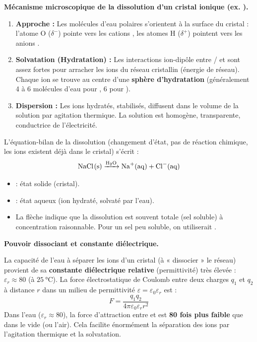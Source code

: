 \documentclass[11pt]{article}
\begin{document}
\textbf{Mécanisme microscopique de la dissolution d'un cristal ionique (ex. ).}\par
\begin{enumerate}
    \item \textbf{Approche :} Les molécules d'eau polaires s'orientent à la surface du cristal : l'atome O ($\delta^-$) pointe vers les cations , les atomes H ($\delta^+$) pointent vers les anions .
    \item \textbf{Solvatation (Hydratation) :} Les interactions ion-dipôle entre / et  sont assez fortes pour arracher les ions du réseau cristallin (énergie de réseau). Chaque ion se trouve au centre d'une \textbf{sphère d'hydratation} (généralement 4 à 6 molécules d'eau pour , 6 pour ).
    \item \textbf{Dispersion :} Les ions hydratés, stabilisés, diffusent dans le volume de la solution par agitation thermique. La solution est homogène, transparente, conductrice de l'électricité.
\end{enumerate}

\begin{aretenir}
L'équation-bilan de la dissolution (changement d'état, pas de réaction chimique, les ions existent déjà dans le cristal) s'écrit :
\[ \ce{NaCl(s) ->[H2O] Na+(aq) + Cl-(aq)} \]
\begin{itemize}
    \item {} : état solide (cristal).
    \item {} : état aqueux (ion hydraté, solvaté par l'eau).
    \item La flèche \ce{->} indique que la dissolution est souvent totale (sel soluble) à concentration raisonnable. Pour un sel peu soluble, on utiliserait \ce{<=>}.
\end{itemize}
\end{aretenir}

\textbf{Pouvoir dissociant et constante diélectrique.}\par
La capacité de l'eau à séparer les ions d'un cristal (à « dissocier » le réseau) provient de sa \textbf{constante diélectrique relative} (permittivité) très élevée : $\varepsilon_r \approx 80$ (à $\SI{25}{\celsius}$).
La force électrostatique de Coulomb entre deux charges $q_1$ et $q_2$ à distance $r$ dans un milieu de permittivité $\varepsilon = \varepsilon_0 \varepsilon_r$ est :
\[ F = \frac{q_1 q_2}{4\pi\varepsilon_0\varepsilon_r r^2} \]
Dans l'eau ($\varepsilon_r \approx 80$), la force d'attraction entre  et  est \textbf{80 fois plus faible} que dans le vide (ou l'air). Cela facilite énormément la séparation des ions par l'agitation thermique et la solvatation.
\end{document}
